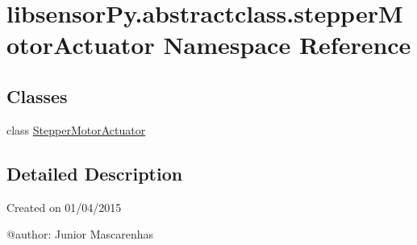 \hypertarget{namespacelibsensorPy_1_1abstractclass_1_1stepperMotorActuator}{}\section{libsensor\+Py.\+abstractclass.\+stepper\+Motor\+Actuator Namespace Reference}
\label{namespacelibsensorPy_1_1abstractclass_1_1stepperMotorActuator}
\subsection*{Classes}
\begin{DoxyCompactItemize}
\item 
class \hyperlink{classlibsensorPy_1_1abstractclass_1_1stepperMotorActuator_1_1StepperMotorActuator}{Stepper\+Motor\+Actuator}
\end{DoxyCompactItemize}


\subsection{Detailed Description}
\begin{DoxyVerb}Created on 01/04/2015

@author: Junior Mascarenhas
\end{DoxyVerb}
 